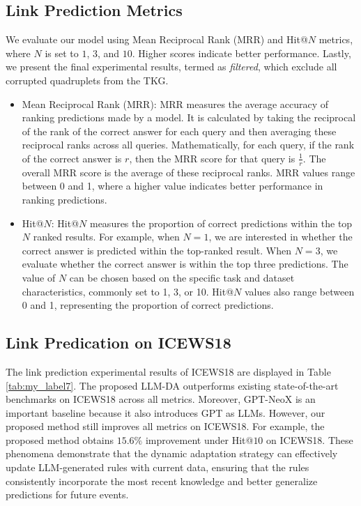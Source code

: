\documentclass{article}
\begin{document}
\subsection{Link Prediction Metrics} \label{metric}
We evaluate our model using Mean Reciprocal Rank (MRR) and Hit@$N$ metrics, where $N$ is set to $1$, $3$, and $10$. Higher scores indicate better performance. Lastly, we present the final experimental results, termed as \textit{filtered}, which exclude all corrupted quadruplets from the TKG.
\begin{itemize}
    \item Mean Reciprocal Rank (MRR): MRR measures the average accuracy of ranking predictions made by a model. It is calculated by taking the reciprocal of the rank of the correct answer for each query and then averaging these reciprocal ranks across all queries. Mathematically, for each query, if the rank of the correct answer is $r$, then the MRR score for that query is $\frac{1}{r}$. The overall MRR score is the average of these reciprocal ranks. MRR values range between 0 and 1, where a higher value indicates better performance in ranking predictions.
    \item Hit@$N$: Hit@$N$ measures the proportion of correct predictions within the top $N$ ranked results. For example, when $N=1$, we are interested in whether the correct answer is predicted within the top-ranked result. When $N=3$, we evaluate whether the correct answer is within the top three predictions. The value of $N$ can be chosen based on the specific task and dataset characteristics, commonly set to 1, 3, or 10. Hit@$N$ values also range between 0 and 1, representing the proportion of correct predictions.
\end{itemize}

\subsection{Link Predication on ICEWS18}\label{lp}
The link prediction experimental results of ICEWS18 are displayed in Table \ref{tab:my_label7}. The proposed LLM-DA outperforms existing state-of-the-art benchmarks on ICEWS18 across all metrics. Moreover, GPT-NeoX \citep{lee2023temporal} is an important baseline because it also introduces GPT as LLMs. However, our proposed method still improves all metrics on ICEWS18. For example, the proposed method obtains $15.6\%$ improvement under Hit@$10$ on ICEWS18. These phenomena demonstrate that the dynamic adaptation strategy can effectively update LLM-generated rules with current data, ensuring that the rules consistently incorporate the most recent knowledge and better generalize predictions for future events.
\end{document}
